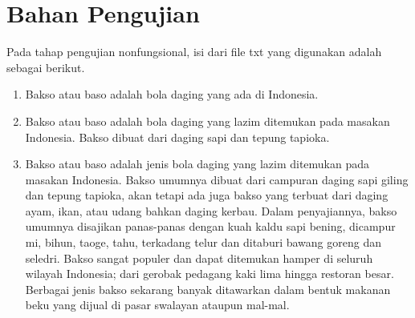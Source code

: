 \chapter{Bahan Pengujian}
\label{lamp:A}

Pada tahap pengujian nonfungsional, isi dari file txt yang digunakan adalah sebagai berikut.

\begin{enumerate}
	\item Bakso atau baso adalah bola daging yang ada di Indonesia.
	\item Bakso atau baso adalah bola daging yang lazim ditemukan pada masakan Indonesia. Bakso dibuat dari daging sapi dan tepung tapioka.
	\item Bakso atau baso adalah jenis bola daging yang lazim ditemukan pada masakan Indonesia. Bakso umumnya dibuat dari campuran daging sapi giling dan tepung tapioka, akan tetapi ada juga bakso yang terbuat dari daging ayam, ikan, atau udang bahkan daging kerbau. Dalam penyajiannya, bakso umumnya disajikan panas-panas dengan kuah kaldu sapi bening, dicampur mi, bihun, taoge, tahu, terkadang telur dan ditaburi bawang goreng dan seledri. Bakso sangat populer dan dapat ditemukan hamper di seluruh wilayah Indonesia; dari gerobak pedagang kaki lima hingga restoran besar. Berbagai jenis bakso sekarang banyak ditawarkan dalam bentuk makanan beku yang dijual di pasar swalayan ataupun mal-mal.
\end{enumerate}